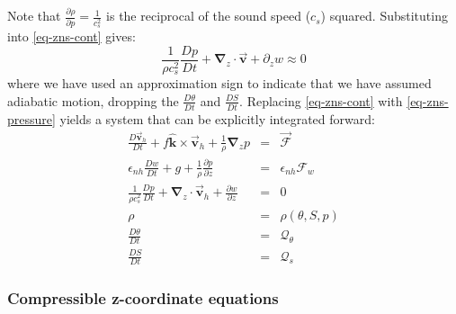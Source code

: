 Note that $\frac{\partial \rho }{\partial p}=\frac{1}{c_{s}^{2}}$ is the
reciprocal of the sound speed ($c_{s}$) squared. Substituting into \ref{eq-zns-cont} gives: 
\begin{equation}
\frac{1}{\rho c_{s}^{2}}\frac{Dp}{Dt}+\mathbf{\nabla }_{z}\cdot \vec{\mathbf{
v}}+\partial _{z}w\approx 0  \label{eq-zns-pressure}
\end{equation}
where we have used an approximation sign to indicate that we have assumed
adiabatic motion, dropping the $\frac{D\theta }{Dt}$ and $\frac{DS}{Dt}$.
Replacing \ref{eq-zns-cont} with \ref{eq-zns-pressure} yields a system that
can be explicitly integrated forward: 
\begin{eqnarray}
\frac{D\vec{\mathbf{v}}_{h}}{Dt}+f\hat{\mathbf{k}}\times \vec{\mathbf{v}}
_{h}+\frac{1}{\rho }\mathbf{\nabla }_{z}p &=&\vec{\mathbf{\mathcal{F}}}
\label{eq-cns-hmom} \\
\epsilon _{nh}\frac{Dw}{Dt}+g+\frac{1}{\rho }\frac{\partial p}{\partial z}
&=&\epsilon _{nh}\mathcal{F}_{w}  \label{eq-cns-hydro} \\
\frac{1}{\rho c_{s}^{2}}\frac{Dp}{Dt}+\mathbf{\nabla }_{z}\cdot \vec{\mathbf{
v}}_{h}+\frac{\partial w}{\partial z} &=&0  \label{eq-cns-cont} \\
\rho &=&\rho (\theta ,S,p)  \label{eq-cns-eos} \\
\frac{D\theta }{Dt} &=&\mathcal{Q}_{\theta }  \label{eq-cns-heat} \\
\frac{DS}{Dt} &=&\mathcal{Q}_{s}  \label{eq-cns-salt}
\end{eqnarray}

\subsubsection{Compressible z-coordinate equations}

